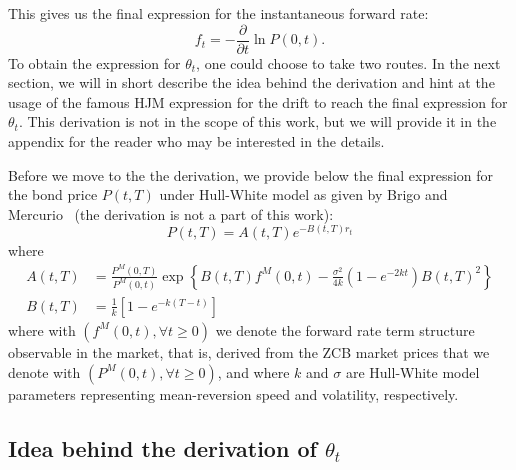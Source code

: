 \documentclass[titlepage, 12pt]{article}
\begin{document}
	This gives us the final expression for the instantaneous forward rate:
	$$f_t = -\frac{\partial}{\partial t}\ln P(0,t).$$
	To obtain the expression for $\theta_t$, one could choose to take two routes. In the next section, we will in short describe the idea behind the derivation and hint at the usage of the famous HJM expression for the drift to reach the final expression for $\theta_t$. This derivation is not in the scope of this work, but we will provide it in the appendix for the reader who may be interested in the details.
	
	Before we move to the the derivation, we provide below the final expression for the bond price $P(t,T)$ under Hull-White model as given by Brigo and Mercurio~\cite{brigo_mercurio2013} (the derivation is not a part of this work):
	\begin{equation}\label{eq:hw_bond_price_full_expression}
		P(t, T)=A(t, T) e^{-B(t, T) r_t}
	\end{equation}
	where
	\begin{equation}\label{eq:hw_ab}
		\begin{split}
			A(t, T)&=\frac{P^M(0, T)}{P^M(0, t)} \exp \left\{B(t, T) f^M(0, t)-\frac{\sigma^2}{4 k}\left(1-e^{-2 k t}\right) B(t, T)^2\right\} \\
			B(t, T)&=\frac{1}{k}\left[1-e^{-k(T-t)}\right]
		\end{split}
	\end{equation}
	where with $(f^M(0,t),\forall t\geq 0)$ we denote the forward rate term structure observable in the market, that is, derived from the ZCB market prices that we denote with $(P^M(0,t),\forall t\geq 0)$, and where $k$ and $\sigma$ are Hull-White model parameters representing mean-reversion speed and volatility, respectively.
	
	\subsection{Idea behind the derivation of $\theta_t$}\label{idea-behind-the-derivation}
	
\end{document}

